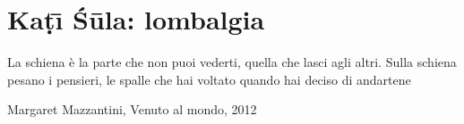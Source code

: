 


\chapter{Ka\d{t}\={\i} \'{S}\={u}la: lombalgia}                  %


\setlength{\epigraphwidth}{0.6\textwidth}

\epigraph{La schiena è la parte che non puoi vederti, quella che lasci agli altri. Sulla schiena pesano i pensieri, le spalle che hai voltato quando hai deciso di andartene}{Margaret Mazzantini, Venuto al mondo, 2012}
